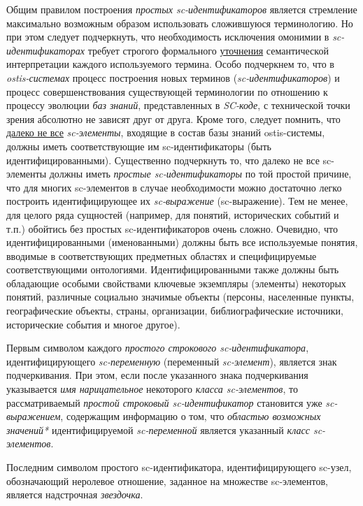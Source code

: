Общим правилом построения \textit{простых sc-идентификаторов} является стремление максимально возможным образом использовать сложившуюся терминологию. Но при этом следует подчеркнуть, что необходимость исключения омонимии в \textit{sc-идентификаторах} требует строгого формального \uline{уточнения} семантической интерпретации каждого используемого термина. Особо подчеркнем то, что в \textit{ostis-системах} процесс построения новых терминов (\textit{sc-идентификаторов}) и процесс совершенствования существующей терминологии по отношению к процессу эволюции \textit{баз знаний}, представленных в \textit{SC-коде}, с технической точки зрения абсолютно не зависят друг от друга. Кроме того, следует помнить, что \uline{далеко не все} \textit{sc-элементы}, входящие в состав базы знаний ostis-системы, должны иметь соответствующие им sc-идентификаторы (быть идентифицированными). Существенно подчеркнуть то, что далеко не все sc-элементы должны иметь \textit{простые sc-идентификаторы} по той простой причине, что для многих sc-элементов в случае необходимости можно достаточно легко построить идентифицирующее их \textit{sc-выражение} (sc-выражение). Тем не менее, для целого ряда сущностей (например, для понятий, исторических событий и т.п.) обойтись без простых sc-идентификаторов очень сложно. Очевидно, что идентифицированными (именованными) должны быть все используемые понятия, вводимые в соответствующих предметных областях и специфицируемые соответствующими онтологиями. Идентифицированными также должны быть обладающие особыми свойствами ключевые экземпляры (элементы) некоторых понятий, различные социально значимые объекты (персоны, населенные пункты, географические объекты, страны, организации, библиографические источники, исторические события и многое другое).

Первым символом каждого \textit{простого строкового sc-идентификатора}, идентифицирующего \textit{sc-переменную} (переменный \textit{sc-элемент}), является знак подчеркивания. При этом, если после указанного знака подчеркивания указывается \textit{имя нарицательное} некоторого \textit{класса sc-элементов}, то рассматриваемый \textit{простой строковый sc-идентификатор} становится уже \textit{sc-выражением}, содержащим информацию о том, что \textit{областью возможных значений*} идентифицируемой \textit{sc-переменной} является указанный \textit{класс sc-элементов}.

Последним символом простого sc-идентификатора, идентифицирующего sc-узел, обозначающий неролевое отношение, заданное на множестве sc-элементов, является надстрочная \textit{звездочка}.

